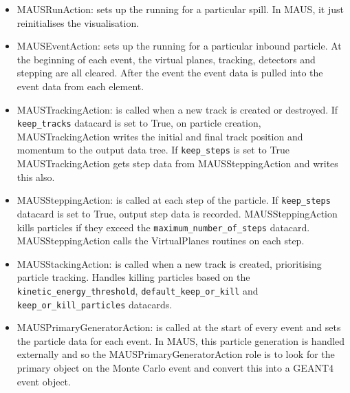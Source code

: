 \begin{itemize}
\item MAUSRunAction: sets up the running for a particular spill. In MAUS, it just reinitialises the visualisation.
\item MAUSEventAction: sets up the running for a particular inbound particle. At the beginning of each event, the virtual planes, tracking, detectors and stepping are all cleared. After the event the event data is pulled into the event data from each element.
\item MAUSTrackingAction: is called when a new track is created or destroyed. If \verb|keep_tracks| datacard is set to True, on particle creation, MAUSTrackingAction writes the initial and final track position and momentum to the output data tree. If \verb|keep_steps| is set to True MAUSTrackingAction gets step data from MAUSSteppingAction and writes this also.
\item MAUSSteppingAction: is called at each step of the particle. If \verb|keep_steps| datacard is set to True, output step data is recorded. MAUSSteppingAction kills particles if they exceed the \verb|maximum_number_of_steps| datacard. MAUSSteppingAction calls the VirtualPlanes routines on each step.
\item MAUSStackingAction: is called when a new track is created, prioritising particle tracking. Handles killing particles based on the \verb|kinetic_energy_threshold|, \verb|default_keep_or_kill| and \verb|keep_or_kill_particles| datacards.
\item MAUSPrimaryGeneratorAction: is called at the start of every event and sets the particle data for each event. In MAUS, this particle generation is handled externally and so the MAUSPrimaryGeneratorAction role is to look for the primary object on the Monte Carlo event and convert this into a GEANT4 event object.
\end{itemize}

